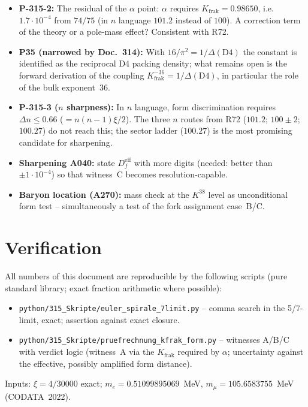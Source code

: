 \begin{itemize}
  \item \textbf{P-315-2:} The residual of the $\alpha$ point: $\alpha$
    requires $K_\text{frak} = 0.98650$, i.e.\ $1.7\cdot10^{-4}$ from
    $74/75$ (in $n$ language $101.2$ instead of $100$). A correction term
    of the theory or a pole-mass effect? Consistent with R72.
  \item \textbf{P35 (narrowed by Doc.~314):} With
    $16/\pi^2 = 1/\Delta(\mathrm{D4})$ the constant is identified as
    the reciprocal D4 packing density; what remains open is the
    forward derivation of the coupling
    $K_\text{frak}^{-36} = 1/\Delta(\mathrm{D4})$, in particular the
    role of the bulk exponent~$36$.
  \item \textbf{P-315-3 ($n$ sharpness):} In $n$ language, form
    discrimination requires $\Delta n \le 0.66$ ($= n(n-1)\xi/2$).
    The three $n$ routes from R72 ($101.2$; $100\pm2$; $100.27$)
    do
    not reach this; the sector ladder ($100.27$) is the most
    promising candidate for sharpening.
  \item \textbf{Sharpening A040:} state $D_f^\text{eff}$ with more
    digits (needed: better than $\pm1\cdot10^{-4}$) so that
    witness~C becomes resolution-capable.
  \item \textbf{Baryon location (A270):} mass check at the $K^{38}$
    level as unconditional form test -- simultaneously a test of the
    fork assignment case~B/C.
\end{itemize}

\section{Verification}

All numbers of this document are reproducible by the following scripts
(pure standard library; exact fraction arithmetic where possible):

\begin{itemize}
  \item \texttt{python/315\_Skripte/euler\_spirale\_7limit.py} --
    comma search in the 5/7-limit, exact; assertion against exact
    closure.
  \item \texttt{python/315\_Skripte/pruefrechnung\_kfrak\_form.py} --
    witnesses A/B/C with verdict logic (witness~A via the $K_\text{frak}$ required by $\alpha$; uncertainty against the
    effective, possibly amplified form distance).
\end{itemize}

Inputs: $\xi=4/30000$ exact; $m_e = 0.51099895069$~MeV,
$m_\mu = 105.6583755$~MeV (CODATA~2022).

